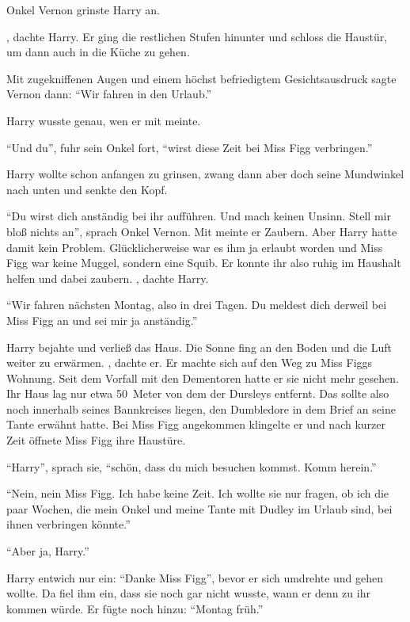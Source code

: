 Onkel Vernon grinste Harry an. 

, dachte Harry. Er ging die restlichen Stufen hinunter und schloss die Haustür, um dann auch in die Küche zu gehen. 

Mit zugekniffenen Augen und einem höchst befriedigtem Gesichtsausdruck sagte Vernon dann: \enquote{Wir fahren in den Urlaub.}

Harry wusste genau, wen er mit  meinte. 

\enquote{Und du}, fuhr sein Onkel fort, \enquote{wirst diese Zeit bei Miss Figg verbringen.}

Harry wollte schon anfangen zu grinsen, zwang dann aber doch seine Mundwinkel nach unten und senkte den Kopf.

\enquote{Du wirst dich anständig bei ihr aufführen. Und mach keinen Unsinn. Stell mir bloß nichts an}, sprach Onkel Vernon. Mit  meinte er Zaubern. Aber Harry hatte damit kein Problem. Glücklicherweise war es ihm ja erlaubt worden und Miss Figg war keine Muggel, sondern eine Squib. Er konnte ihr also ruhig im Haushalt helfen und dabei zaubern. , dachte Harry.

\enquote{Wir fahren nächsten Montag, also in drei Tagen. Du meldest dich derweil bei Miss Figg an und \gst sei mir ja anständig.}

Harry bejahte und verließ das Haus. Die Sonne fing an den Boden und die Luft weiter zu erwärmen. , dachte er. Er machte sich auf den Weg zu Miss Figgs Wohnung. Seit dem Vorfall mit den Dementoren hatte er sie nicht mehr gesehen. Ihr Haus lag nur etwa 50~Meter von dem der Dursleys entfernt. Das sollte also noch innerhalb seines Bannkreises liegen, den Dumbledore in dem Brief an seine Tante erwähnt hatte. Bei Miss Figg angekommen klingelte er und nach kurzer Zeit öffnete Miss Figg ihre Haustüre.

\enquote{Harry}, sprach sie, \enquote{schön, dass du mich besuchen kommst. Komm herein.}

\enquote{Nein, nein Miss Figg. Ich habe keine Zeit. Ich wollte sie nur fragen, ob ich die paar Wochen, die mein Onkel und meine Tante mit Dudley im Urlaub sind, bei ihnen verbringen könnte.}

\enquote{Aber ja, Harry.}

Harry entwich nur ein: \enquote{Danke Miss Figg}, bevor er sich umdrehte und gehen wollte. Da fiel ihm ein, dass sie noch gar nicht wusste, wann er denn zu ihr kommen würde. Er fügte noch hinzu: \enquote{Montag früh.}

